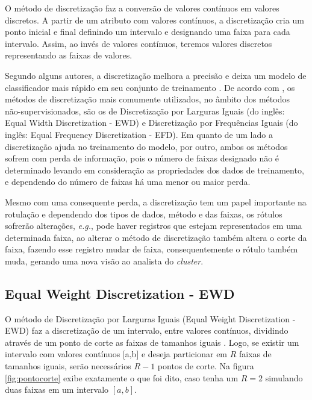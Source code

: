 O método de discretização faz a conversão de valores contínuos em valores discretos. A partir de um atributo com valores contínuos, a discretização cria um ponto inicial e final definindo um intervalo e designando uma faixa para cada intervalo. Assim, ao invés de valores contínuos, teremos valores discretos representando as faixas de valores. 

Segundo alguns autores, a discretização melhora a precisão e deixa um modelo de classificador mais rápido em seu conjunto de treinamento \cite{Catlett2006b,Hwang2002}. De acordo com \cite{Kotsiantis2006, Dougherty1995}, os métodos de discretização mais comumente utilizados, no âmbito dos métodos não-supervisionados, são os de Discretização por Larguras Iguais (do inglês: Equal Width Discretization - EWD) e Discretização por Frequências Iguais (do inglês: Equal Frequency Discretization - EFD). Em quanto de um lado a discretização ajuda no treinamento do modelo, por outro, ambos os métodos sofrem com perda de informação, pois o número de faixas designado não é determinado levando em consideração as propriedades dos dados de treinamento, e dependendo do número de faixas há uma menor ou maior perda. 

Mesmo com uma consequente perda, a discretização tem um papel importante na rotulação e dependendo dos tipos de dados, método e das faixas, os rótulos sofrerão alterações, \textit{e.g.}, pode haver registros que estejam representados em uma determinada faixa, ao alterar o método de discretização também altera o corte da faixa, fazendo esse registro mudar de faixa, consequentemente o rótulo também muda, gerando uma nova visão ao analista do \textit{cluster}. 





\subsection{Equal Weight Discretization - EWD}\label{cap:refTeor:subsec:ewd}

O método de Discretização por Larguras Iguais (Equal Weight Discretization - EWD) faz a discretização de um intervalo, entre valores contínuos, dividindo através de um ponto de corte as faixas de tamanhos iguais \cite{Baron2016,Yang2002}. Logo, se existir um intervalo com valores contínuos [a,b] e deseja particionar em ${R}$ faixas de tamanhos iguais, serão necessários ${R-1}$ pontos de corte. Na figura \ref{fig:pontocorte} exibe exatamente o que foi dito, caso tenha um ${R=2}$ simulando duas faixas em um intervalo ${[a,b]}$.


